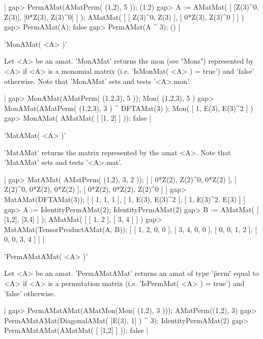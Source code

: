 |    gap> PermAMat(AMatPerm( (1,2), 5 ));
    (1,2)
    gap> A := AMatMat( [ [Z(3)^0, Z(3)], [0*Z(3), Z(3)^0] ] );
    AMatMat(
      [ [ Z(3)^0, Z(3) ], [ 0*Z(3), Z(3)^0 ] ]
    )
    gap> PermAMat(A);                   
    false
    gap> PermAMat(A ^ 3);               
    () |


'MonAMat( <A> )'

Let <A> be an amat. 'MonAMat' returns the mon (see "Mons") represented 
by <A> if <A> is a monomial matrix (i.e. 'IsMonMat( <A> ) = true')
and 'false' otherwise. Note that 'MonAMat' sets and tests '<A>.mon'.

|    gap> MonAMat(AMatPerm( (1,2,3), 5 ));
    Mon( (1,2,3), 5 )
    gap> MonAMat(AMatPerm( (1,2,3), 3 ) ^ DFTAMat(3) );
    Mon( [ 1, E(3), E(3)^2 ] ) 
    gap> MonAMat( AMatMat( [ [1, 2] ] ));
    false |


'MatAMat( <A> )'

'MatAMat' returns the matrix represented by the amat <A>. 
Note that 'MatAMat' sets and tests '<A>.mat'.

|    gap> MatAMat( AMatPerm( (1,2), 3, 2 ));
    [ [ 0*Z(2), Z(2)^0, 0*Z(2) ], [ Z(2)^0, 0*Z(2), 0*Z(2) ], 
      [ 0*Z(2), 0*Z(2), Z(2)^0 ] ]
    gap> MatAMat(DFTAMat(3)); 
    [ [ 1, 1, 1 ], [ 1, E(3), E(3)^2 ], [ 1, E(3)^2, E(3) ] ]
    gap> A := IdentityPermAMat(2); 
    IdentityPermAMat(2)
    gap> B := AMatMat( [ [1,2], [3,4] ] );
    AMatMat(
      [ [ 1, 2 ], [ 3, 4 ] ]
    )
    gap> MatAMat(TensorProductAMat(A, B));
    [ [ 1, 2, 0, 0 ], [ 3, 4, 0, 0 ], [ 0, 0, 1, 2 ], [ 0, 0, 3, 4 ] ] |


'PermAMatAMat( <A> )'

Let <A> be an amat. 'PermAMatAMat' returns an amat of type '\"perm\"'
equal to <A> if <A> is a permutation matrix 
(i.e. 'IsPermMat( <A> ) = true') and 'false' otherwise. 

|    gap> PermAMatAMat(AMatMon(Mon( (1,2), 3 )));
    AMatPerm((1,2), 3)
    gap> PermAMatAMat(DiagonalAMat( [E(3), 1] ) ^ 3);
    IdentityPermAMat(2)
    gap> PermAMatAMat(AMatMat( [ [1,2] ] ));
    false |


